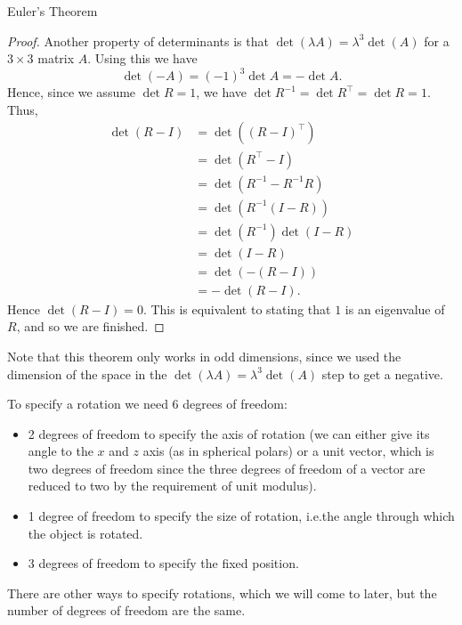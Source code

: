 \documentclass[fleqn]{NotesClass}
\newcommand*{\ident}{I}
\newcommand*{\trans}{\top}
\begin{document}
\begin{thm}{Euler's Theorem}{}
\begin{proof}
            Another property of determinants is that \(\det(\lambda A) = \lambda^3\det(A)\) for a \(3\times 3\) matrix \(A\).
            Using this we have
            \begin{equation}
                \det(-A) = (-1)^3\det A = -\det A.
            \end{equation}
            Hence, since we assume \(\det R = 1\), we have \(\det R^{-1} = \det R^\trans = \det R = 1\).
            Thus,
            \begin{align}
                \det(R - \ident) &= \det((R - \ident)^{\trans})\\
                &= \det(R^\trans - \ident)\\
                &= \det(R^{-1} - R^{-1}R)\\
                &= \det(R^{-1}(\ident - R))\\
                &= \det(R^{-1})\det(\ident - R)\\
                &= \det(\ident - R)\\
                &= \det(-(R - \ident))\\
                &= -\det(R - \ident).
            \end{align}
            Hence \(\det(R - \ident) = 0\).
            This is equivalent to stating that \(1\) is an eigenvalue of \(R\), and so we are finished.
        \end{proof}
    \end{thm}
    Note that this theorem only works in odd dimensions, since we used the dimension of the space in the \(\det(\lambda A) = \lambda^3\det(A)\) step to get a negative.
    
    To specify a rotation we need 6 degrees of freedom:
    \begin{itemize}
        \item 2 degrees of freedom to specify the axis of rotation (we can either give its angle to the \(x\) and \(z\) axis (as in spherical polars) or a unit vector, which is two degrees of freedom since the three degrees of freedom of a vector are reduced to two by the requirement of unit modulus).
        \item 1 degree of freedom to specify the size of rotation, i.e.\@ the angle through which the object is rotated.
        \item 3 degrees of freedom to specify the fixed position.
    \end{itemize}
    There are other ways to specify rotations, which we will come to later, but the number of degrees of freedom are the same.
    
\end{document}

